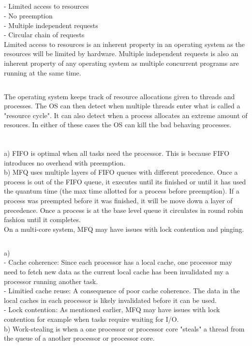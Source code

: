 \documentclass{article}
\begin{document}
\subsection{}
- Limited access to resources \\
- No preemption \\
- Multiple independent requests \\
- Circular chain of requests \\

Limited access to resources is an inherent property in an operating system as the resources will be limited by hardware. Multiple independent requests is also an inherent property of any operating system as multiple concurrent programs are running at the same time.

\subsection{}
The operating system keeps track of resource allocations given to threads and processes. The OS can then detect when multiple threads enter what is called a "resource cycle". It can also detect when a process allocates an extreme amount of resouces. In either of these cases the OS can kill the bad behaving processes.


\section{}
\subsection{}
a) FIFO is optimal when all tasks need the processor. This is because FIFO introduces no overhead with preemption. \\

b) MFQ uses multiple layers of FIFO queues with different precedence. Once a process is out of the FIFO queue, it executes until its finished or until it has used the quantum time (the max time allotted for a process before preemption). If a process was preempted before it was finished, it will be move down a layer of precedence. Once a process is at the base level queue it circulates in round robin fashion until it completes. \\

On a multi-core system, MFQ may have issues with lock contention and pinging.

\subsection{}
a) \\
- Cache coherence: Since each processor has a local cache, one processor may need to fetch new data as the current local cache has been invalidated my a processor running another task. \\
- Limitied cache reuse: A consequence of poor cache coherence. The data in the local caches in each processor is likely invalidated before it can be used. \\
- Lock contention: As mentioned earlier, MFQ may have issues with lock contention for example when tasks require waiting for I/O. \\

b) Work-stealing is when a one processor or processor core "steals" a thread from the queue of a another processor or processor core.
\end{document}
